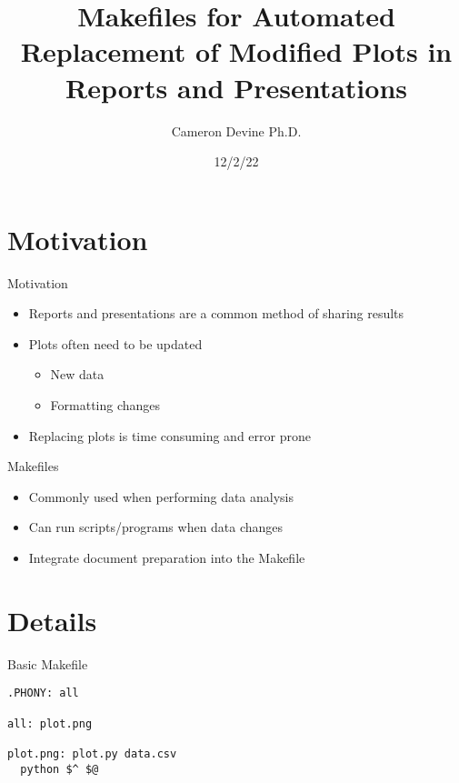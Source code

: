 \documentclass{beamer}
\title{Makefiles for Automated Replacement of Modified Plots in Reports and Presentations}
\institute{Saint Martin's University}
\author{Cameron Devine Ph.D.}
\date{12/2/22}
\begin{document}
\begin{frame}[plain]
  \maketitle
\end{frame}

\section{Motivation}

\begin{frame}{Motivation}
  \begin{itemize}
    \pause\item Reports and presentations are a common method of sharing results
    \pause\item Plots often need to be updated
    \begin{itemize}
      \pause\item New data
      \pause\item Formatting changes
    \end{itemize}
    \pause\item Replacing plots is time consuming and error prone
  \end{itemize}
\end{frame}

\begin{frame}{Makefiles}
  \begin{itemize}
    \pause\item Commonly used when performing data analysis
    \pause\item Can run scripts/programs when data changes
    \pause\item Integrate document preparation into the Makefile
  \end{itemize}
\end{frame}

\section{Details}

\begin{frame}[fragile]{Basic Makefile}
  \begin{lstlisting}
.PHONY: all

all: plot.png

plot.png: plot.py data.csv
  python $^ $@
  \end{lstlisting}
\end{frame}
\end{document}
